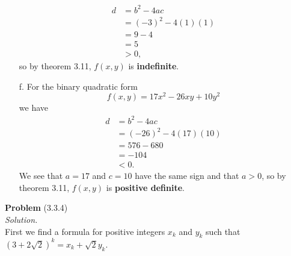\documentclass[12 pt]{amsart}
\begin{document}
\begin{enumerate}
\begin{align*}
        d &= b^2 - 4ac \\
          &= (-3)^2 - 4(1)(1) \\
          &= 9 - 4 \\
          &= 5 \\
          &> 0,
      \end{align*}
      so by theorem 3.11, 
      $f(x,y)$ is \textbf{indefinite}.
		\item[f.]
      For the binary quadratic form
      \[
        f(x,y) = 17x^2 - 26xy + 10y^2
      \]
      we have
      \begin{align*}
        d &= b^2 - 4ac \\
          &= (-26)^2  - 4(17)(10) \\
          &= 576 - 680 \\
          &= -104 \\
          &< 0.
      \end{align*}
      We see that $a = 17$ and $c = 10$ have the 
      same sign and that $a > 0$, 
      so by theorem 3.11, 
      $f(x,y)$ is \textbf{positive definite}.
	\end{enumerate}
\vfill
\newpage



\phantom{\quad} \vfill
\noindent
\textbf{Problem} (3.3.4) \\[4ex]
\emph{Solution.} \\[2ex]
  First we find a formula for positive integers
  $x_k$ and $y_k$ such that 
  $(3 + 2 \sqrt{2})^k = x_k + \sqrt{2}y_k$.
\end{document}
